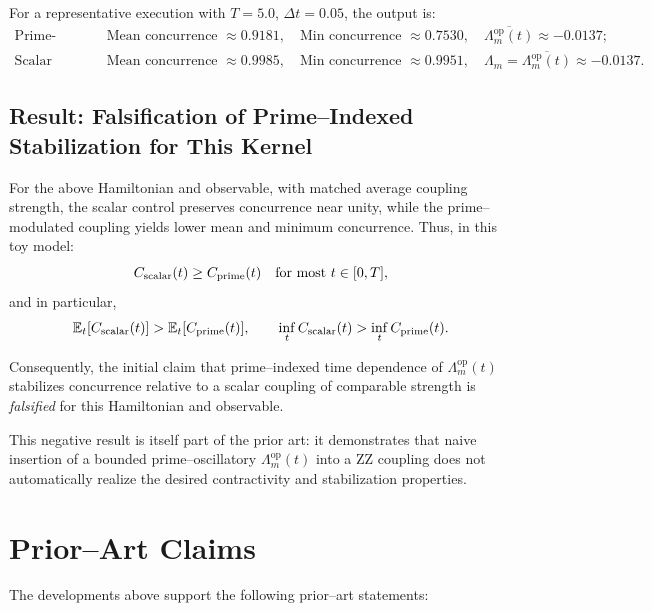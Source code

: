 \documentclass[11pt]{article}
\begin{document}
For a representative execution with \(T=5.0\), \(\Delta t = 0.05\), the output is:
\begin{align*}
  \text{Prime-weighted run:} & \quad \text{Mean concurrence } \approx 0.9181, \quad
  \text{Min concurrence } \approx 0.7530, \quad
  \overline{\Lambda_m^{\mathrm{op}}(t)} \approx -0.0137;\\
  \text{Scalar control (matched):} & \quad \text{Mean concurrence } \approx 0.9985, \quad
  \text{Min concurrence } \approx 0.9951, \quad
  \Lambda_m = \overline{\Lambda_m^{\mathrm{op}}(t)} \approx -0.0137.
\end{align*}

\subsection{Result: Falsification of Prime–Indexed Stabilization for This Kernel}

For the above Hamiltonian and observable, with matched average coupling strength, the scalar control preserves concurrence near unity, while the prime–modulated coupling yields lower mean and minimum concurrence. Thus, in this toy model:
\begin{equation}
  C_{\rm scalar}(t) \ge C_{\rm prime}(t) \quad \text{for most } t \in [0,T],
\end{equation}
and in particular,
\begin{equation}
  \mathbb{E}_t[C_{\rm scalar}(t)] > \mathbb{E}_t[C_{\rm prime}(t)], \qquad
  \inf_t C_{\rm scalar}(t) > \inf_t C_{\rm prime}(t).
\end{equation}

Consequently, the initial claim that prime–indexed time dependence of \(\Lambda_m^{\mathrm{op}}(t)\) stabilizes concurrence relative to a scalar coupling of comparable strength is \emph{falsified} for this Hamiltonian and observable.

This negative result is itself part of the prior art: it demonstrates that naive insertion of a bounded prime–oscillatory \(\Lambda_m^{\mathrm{op}}(t)\) into a ZZ coupling does not automatically realize the desired contractivity and stabilization properties.

\section{Prior–Art Claims}

The developments above support the following prior–art statements:
\end{document}
